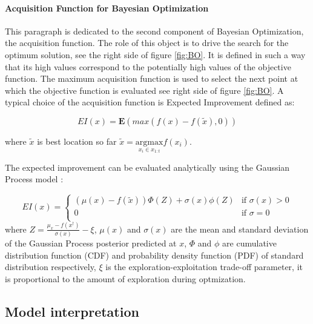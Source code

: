 \paragraph{ Acquisition Function for Bayesian Optimization} \mbox{}

This paragraph is dedicated to the second component of Bayesian Optimization, the acquisition function. The role of this object is to drive the search for the optimum solution, see the right side of figure \ref{fig:BO}. It is defined in such a way that its high values correspond to the potentially high values of the objective function. The maximum acquisition function is used to select the next point at which the objective function is evaluated see right side of figure \ref{fig:BO}. A typical choice of the acquisition function is Expected Improvement defined as: 

\begin{equation}
    EI(x) = \mathbf{E}\left(max( f(x)-f(\widetilde{x}) , 0) \right) 
\end{equation}

where $\widetilde{x}$ is best location so far $\widetilde{x} = \underset{{x_i \in x_{1:t}}}{\mathrm{argmax}} f(x_i)$. 

The expected improvement can be evaluated analytically using the Gaussian Process model \cite{GaussianProcesses}: 

\begin{equation}
    EI(x) =   \left\{ \begin{array}{ll}
(\mu(x)-f(\widetilde{x}))\Phi(Z) + \sigma(x)\phi(Z) & \textrm{if $\sigma(x)>0$}\\
0 & \textrm{if  $\sigma=0$}\\
\end{array} \right.
\end{equation}
where $Z= \frac{\mu_{x}-f(x^{\dagger})}{\sigma(x)}-\xi$, $\mu(x)$ and $\sigma(x)$ are the mean and standard deviation of the Gaussian Process posterior predicted at $x$, $\Phi$ and $\phi$ are cumulative distribution function (CDF) and probability density function (PDF) of standard distribution respectively, $\xi$ is the exploration-exploitation trade-off parameter, it is proportional to the amount of exploration during optmization. 

\subsection{Model interpretation}

